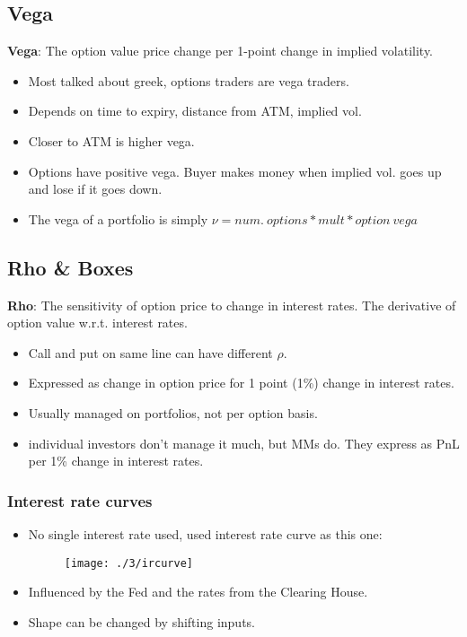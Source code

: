 \documentclass{article}
\begin{document}
\subsection{Vega}
\textbf{Vega}: The option value price change per 1-point change in implied
volatility.
\begin{itemize}
    \item Most talked about greek, options traders are vega traders.
    \item Depends on time to expiry, distance from ATM, implied vol.
    \item Closer to ATM is higher vega.
    \item Options have positive vega. Buyer makes money when implied vol. goes
    up and lose if it goes down.
    \item The vega of a portfolio is simply $\nu = num. \ options * mult *
    option \ vega$
\end{itemize}

\subsection{Rho \& Boxes}
\textbf{Rho}: The sensitivity of option price to change in interest rates. 
The derivative of option value w.r.t. interest rates.
\begin{itemize}
    \item Call and put on same line can have different $\rho$.
    \item Expressed as change in option price for 1 point (1\%) change in
    interest rates.
    \item Usually managed on portfolios, not per option basis.
    \item individual investors don't manage it much, but MMs do. They express as
    PnL per 1\% change in interest rates.
\end{itemize}
\newpage
\subsubsection{Interest rate curves}
\begin{itemize}
    \item No single interest rate used, used interest rate curve as this one:
    \begin{figure}[h]
        \texttt{[image: ./3/ircurve]}
        \centering
    \end{figure}
    \item Influenced by the Fed and the rates from the Clearing House.
    \item Shape can be changed by shifting inputs.
\end{itemize}
\end{document}
